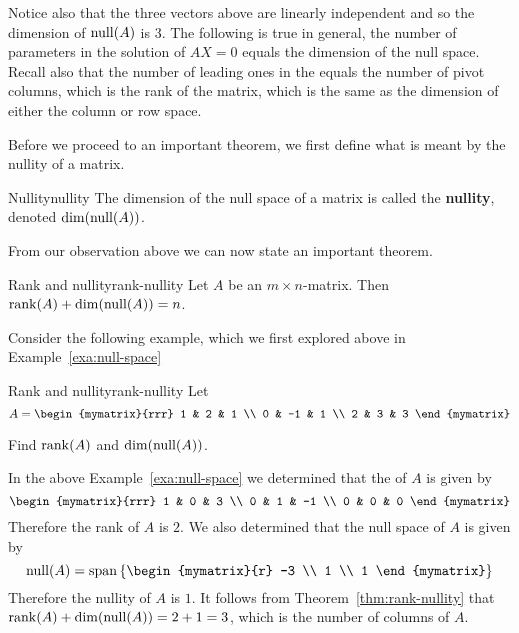 Notice also that the three vectors above are linearly independent and
so the dimension of $\nullspace(A) $ is 3. The following is true
in general, the number of parameters in the solution of $AX=0$ equals
the dimension of the null space. Recall also that the number of
leading ones in the {\rref} equals the number of pivot columns, which
is the rank of the matrix, which is the same as the dimension of
either the column or row space.

Before we proceed to an important theorem, we first define what is
meant by the nullity of a matrix.

\begin{definition}{Nullity}{nullity}
  The dimension of the null space of a matrix is called the
  \textbf{nullity}, denoted
  $\dim( \nullspace(A))$.
\end{definition}

From our observation above we can now state an important theorem.

\begin{theorem}{Rank and nullity}{rank-nullity}
  Let $A$ be an $m\times n$-matrix. Then
  $\rank(A) + \dim( \nullspace(A)) =n$.
\end{theorem}

Consider the following example, which we first explored above in
Example~\ref{exa:null-space}

\begin{example}{Rank and nullity}{rank-nullity}
  Let
  \begin{equation*}
    A=\begin{mymatrix}{rrr}
      1 & 2 & 1 \\
      0 & -1 & 1 \\
      2 & 3 & 3
    \end{mymatrix}
  \end{equation*}

  Find $\rank(A)$ and $\dim( \nullspace(A))$.
\end{example}

\begin{solution}
  In the above Example~\ref{exa:null-space} we determined that the
  {\rref} of $A$ is given by
  \begin{equation*}
    \begin{mymatrix}{rrr}
      1 & 0 & 3 \\
      0 & 1 & -1  \\
      0 & 0 & 0
    \end{mymatrix}
  \end{equation*}
  Therefore the rank of $A$ is $2$. We also determined that the null
  space of $A$ is given by
  \begin{equation*}
    \nullspace(A) = \sspan \set{\begin{mymatrix}{r}
        -3 \\
        1 \\
        1
      \end{mymatrix}
    }
  \end{equation*}
  Therefore the nullity of $A$ is $1$. It follows from
  Theorem~\ref{thm:rank-nullity} that
  $\rank(A) + \dim( \nullspace(A)) = 2 + 1 = 3$, which
  is the number of columns of $A$.
\end{solution}

